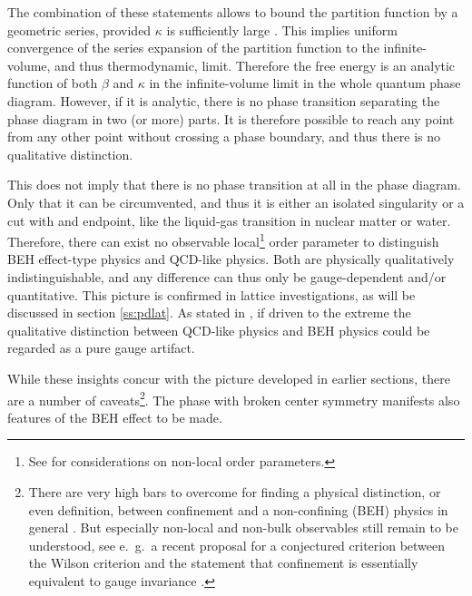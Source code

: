 \documentclass[final,12pt]{article}
\newcommand*{\1}{1\!\!\!\bot}
\begin{document}
The combination of these statements allows to bound the partition function by a geometric series, provided $\kappa$ is sufficiently large \cite{Osterwalder:1977pc,Fradkin:1978dv}. This implies uniform convergence of the series expansion of the partition function to the infinite-volume, and thus thermodynamic, limit. Therefore the free energy is an analytic function of both $\beta$ and $\kappa$ in the infinite-volume limit in the whole quantum phase diagram. However, if it is analytic, there is no phase transition separating the phase diagram in two (or more) parts. It is therefore possible to reach any point from any other point without crossing a phase boundary, and thus there is no qualitative distinction.

This does not imply that there is no phase transition at all in the phase diagram. Only that it can be circumvented, and thus it is either an isolated singularity or a cut with and endpoint, like the liquid-gas transition in nuclear matter or water. Therefore, there can exist no observable local\footnote{See \cite{Greensite:2017ajx,Greensite:2018mhh} for considerations on non-local order parameters.} order parameter to distinguish BEH effect-type physics and QCD-like physics. Both are physically qualitatively indistinguishable, and any difference can thus only be gauge-dependent and/or quantitative. This picture is confirmed in lattice investigations, as will be discussed in section \ref{ss:pdlat}. As stated in \cite{Seiler:2015rwa}, if driven to the extreme the qualitative distinction between QCD-like physics and BEH physics could be regarded as a pure gauge artifact.

While these insights concur with the picture developed in earlier sections, there are a number of caveats\footnote{There are very high bars to overcome for finding a physical distinction, or even definition, between confinement and a non-confining (BEH) physics in general \cite{Seiler:2015rwa}. But especially non-local and non-bulk observables still remain to be understood, see e.\ g.\ a recent proposal for a conjectured criterion between the Wilson criterion and the statement that confinement is essentially equivalent to gauge invariance \cite{Greensite:2017ajx,Greensite:2018mhh}.}. The phase with broken center symmetry manifests also features of the BEH effect \cite{Lang:1981qg,Drouffe:1984hb,Baier:1986ni,Capri:2012cr} to be made.
\end{document}
